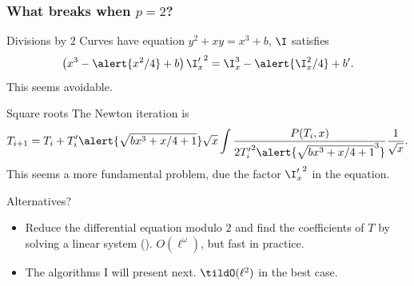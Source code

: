 \documentclass[10pt]{beamer}
\renewcommand{\emph}[1]{{\usebeamercolor[fg]{structure}#1}}
\begin{document}
\begin{frame}
  \frametitle{What breaks when $p=2$?}
  
  \vspace{-1mm}

  \begin{block}{Divisions by $2$}
    Curves have equation \emph{$y^2+xy=x^3+b$}, $\I$ satisfies
    \[\left(x^3-\alert{x^2/4} + b\right){\I_x'}^2 = \I_x^3 - \alert{\I_x^2/4} + b'.\]
    This seems avoidable.
  \end{block}

  \vspace{-2mm}

  \begin{block}{Square roots}
    The Newton iteration is
    \begin{equation*}
      T_{i+1} = T_i + T_i'\alert{\sqrt{bx^3 + x/4 + 1}}\sqrt{x}
      \int\frac{P(T_i,x)}{2{T_i'}^2\alert{\sqrt{bx^3 + x/4 + 1}^3}}\frac{1}{\sqrt{x}}.
    \end{equation*}
    This seems a more fundamental problem, due the factor ${\I_x'}^2$
    in the equation.
  \end{block}

  \vspace{-2mm}

  \begin{block}{Alternatives?}
    \begin{itemize}
    \item Reduce the differential equation modulo $2$ and find the
      coefficients of $T$ by solving a linear system
      (\cite{lercier96}). \alert{$O(\ell^\omega)$}, but fast in
      practice.
    \item The algorithms I will present next. \alert{$\tildO(\ell^2)$}
      in the best case.
    \end{itemize}
  \end{block}
\end{frame}

\end{document}
